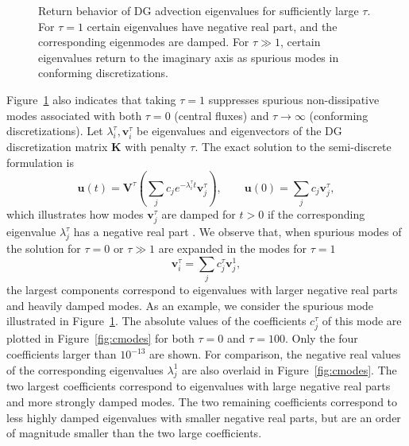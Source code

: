 \documentclass[preprint,10pt]{elsarticle}
\newcommand{\LRp}[1]{\left( #1 \right)}
\begin{document}
\begin{figure}
\caption{Return behavior of DG advection eigenvalues for sufficiently large $\tau$.  For $\tau = 1$ certain eigenvalues have negative real part, and the corresponding eigenmodes are damped.  For $\tau \gg 1$, certain eigenvalues return to the imaginary axis as spurious modes in conforming discretizations. }
\label{fig:spurious}
\end{figure}

Figure~\ref{fig:spurious} also indicates that taking $\tau = 1$ suppresses spurious non-dissipative modes associated with both $\tau = 0$ (central fluxes) and $\tau\rightarrow \infty$ (conforming discretizations).  Let $\lambda^{\tau}_i, \bm{v}^{\tau}_i$ be eigenvalues and eigenvectors of the DG discretization matrix $\bm{K}$ with penalty $\tau$.  The exact solution to the semi-discrete formulation is 
\[
\bm{u}(t) =\bm{V}^{\tau}\LRp{ \sum_j c_j e^{-\lambda_i^{\tau} t} \bm{v}^{\tau}_j}, \qquad \bm{u}(0) = \sum_j c_j\bm{v}^{\tau}_j,
\]
which illustrates how modes $\bm{v}^{\tau}_j$ are damped for $t > 0$ if the corresponding eigenvalue $\lambda^{\tau}_j$ has a negative real part .  We observe that, when spurious modes of the solution for $\tau = 0$ or $\tau \gg 1$ are expanded in the modes for $\tau = 1$
\[
\bm{v}^{\tau}_i = \sum_j c^\tau_j \bm{v}^{1}_j, 
\]
the largest components correspond to eigenvalues with larger negative real parts and heavily damped modes.  As an example, we consider the spurious mode illustrated in Figure~\ref{fig:spurious}.  The absolute values of the coefficients $c^\tau_j$ of this mode are plotted in Figure~\ref{fig:cmodes} for both $\tau = 0$ and $\tau = 100$.  Only the four coefficients larger than $10^{-13}$ are shown.  For comparison, the negative real values of the corresponding eigenvalues $\lambda^1_j$ are also overlaid in Figure~\ref{fig:cmodes}.  The two largest coefficients correspond to eigenvalues with large negative real parts and more strongly damped modes.  The two remaining coefficients correspond to less highly damped eigenvalues with smaller negative real parts, but are an order of magnitude smaller than the two large coefficients.  
\end{document}
